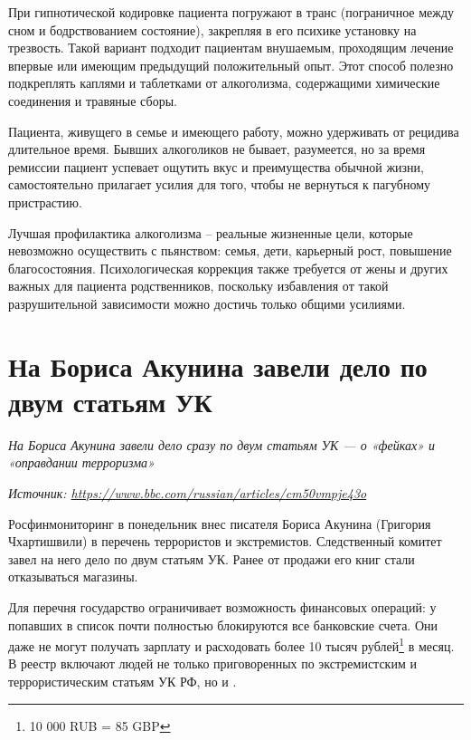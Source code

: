 При гипнотической кодировке пациента погружают в транс (пограничное между сном и бодрствованием состояние), закрепляя в его психике установку на трезвость. Такой вариант подходит пациентам внушаемым, проходящим лечение впервые или имеющим предыдущий положительный опыт. Этот способ полезно подкреплять каплями и таблетками от алкоголизма, содержащими химические соединения и травяные сборы.

Пациента, живущего в семье и имеющего работу, можно удерживать от рецидива длительное время. Бывших алкоголиков не бывает, разумеется, но за время ремиссии пациент успевает ощутить вкус и преимущества обычной жизни, самостоятельно прилагает усилия для того, чтобы не вернуться к пагубному пристрастию.

Лучшая профилактика алкоголизма – реальные жизненные цели, которые невозможно осуществить с пьянством: семья, дети, карьерный рост, повышение благосостояния. Психологическая коррекция также требуется от жены и других важных для пациента родственников, поскольку избавления от такой разрушительной зависимости можно достичь только общими усилиями.

\clearpage

\section[Про Бориса Акунина]{На Бориса Акунина завели дело по двум статьям УК}

\textit{На Бориса Акунина завели дело сразу по двум статьям УК --- о «фейках» и «оправдании терроризма»}

\textit{Источник: \url{https://www.bbc.com/russian/articles/cm50vmpje43o}}

\begin{fancyquotes}
    Росфинмониторинг в понедельник внес писателя Бориса Акунина (Григория Чхартишвили) в перечень террористов и экстремистов. Следственный комитет завел на него дело по двум статьям УК. Ранее от продажи его книг стали отказываться магазины.
\end{fancyquotes}

Для 
перечня государство ограничивает возможность
финансовых операций:
у попавших в список почти полностью блокируются
все банковские счета.
Они даже не могут получать зарплату и расходовать более
10 тысяч рублей\footnote{10 000 RUB = 85 GBP} в месяц.
В реестр включают людей не только приговоренных
по экстремистским и террористическим статьям УК РФ,
но и .

